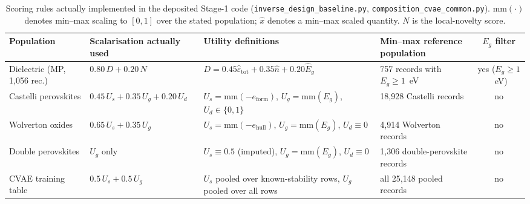 
\begin{table}[htbp]
\centering
\footnotesize
\setlength{\tabcolsep}{3pt}
\caption{Scoring rules actually implemented in the deposited Stage-1 code (\texttt{inverse\_design\_baseline.py}, \texttt{composition\_cvae\_common.py}). $\mathrm{mm}(\cdot)$ denotes min--max scaling to $[0,1]$ over the stated population; $\hat{x}$ denotes a min--max scaled quantity. $N$ is the local-novelty score.}
\label{tab:a1_true_rules}
\begin{tabular}{p{}p{}p{}p{}c}
\toprule
Population & Scalarisation actually used & Utility definitions & Min--max reference population & $E_g$ filter \\
\midrule
Dielectric (MP, 1{,}056 rec.) & $0.80\,D+0.20\,N$ & $D=0.45\hat{\varepsilon}_{\mathrm{tot}}+0.35\hat{n}+0.20\hat{E}_g$ & 757 records with $E_g\ge1$~eV & yes ($E_g\ge1$~eV) \\
Castelli perovskites & $0.45\,U_s+0.35\,U_g+0.20\,U_d$ & $U_s=\mathrm{mm}(-e_{\mathrm{form}})$, $U_g=\mathrm{mm}(E_g)$, $U_d\in\{0,1\}$ & 18{,}928 Castelli records & no \\
Wolverton oxides & $0.65\,U_s+0.35\,U_g$ & $U_s=\mathrm{mm}(-e_{\mathrm{hull}})$, $U_g=\mathrm{mm}(E_g)$, $U_d\equiv0$ & 4{,}914 Wolverton records & no \\
Double perovskites & $U_g$ only & $U_s\equiv0.5$ (imputed), $U_g=\mathrm{mm}(E_g)$, $U_d\equiv0$ & 1{,}306 double-perovskite records & no \\
CVAE training table & $0.5\,U_s+0.5\,U_g$ & $U_s$ pooled over known-stability rows, $U_g$ pooled over all rows & all 25{,}148 pooled records & no \\
\bottomrule
\end{tabular}
\end{table}

